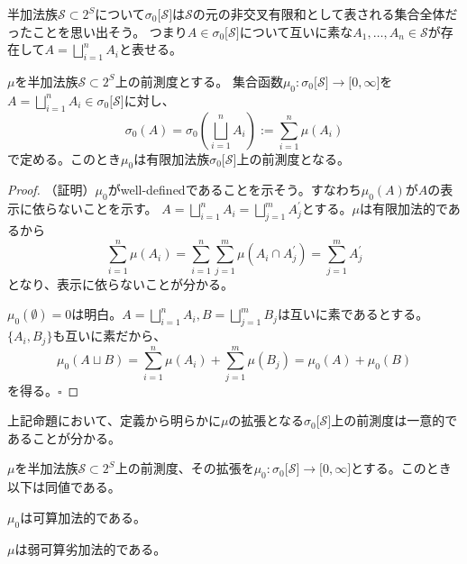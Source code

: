\documentclass[../root.tex]{subfiles}
\begin{document}
半加法族$ \mathscr{S}\subset 2^{S} $について$ \sigma_{0}\lbrack \mathscr{S} \rbrack $は$ \mathscr{S} $の元の非交叉有限和として表される集合全体だったことを思い出そう。
つまり$ A\in\sigma_{0}\lbrack \mathscr{S} \rbrack $について互いに素な$ A_{1}, \dotsc, A_{n}\in\mathscr{S} $が存在して$ A=\bigsqcup_{i=1}^{n}A_{i} $と表せる。

\begin{Prop}{}{}
$ \mu $を半加法族$ \mathscr{S}\subset 2^{S} $上の前測度とする。
集合函数$ \mu_{0}\colon\sigma_{0}\lbrack \mathscr{S} \rbrack\rightarrow\lbrack 0, \infty \rbrack $を
$ A=\bigsqcup_{i=1}^{n}A_{i}\in\sigma_{0}\lbrack \mathscr{S} \rbrack $に対し、
\[ \sigma_{0}( A )=\sigma_{0}\left( \bigsqcup_{i=1}^{n}A_{i} \right):=\sum_{i=1}^{n}\mu( A_{i} ) \]
で定める。このとき$ \mu_{0} $は有限加法族$ \sigma_{0}\lbrack \mathscr{S} \rbrack $上の前測度となる。
\end{Prop}

\begin{proof}
（証明）$ \mu_{0} $がwell-definedであることを示そう。すなわち$ \mu_{0}( A ) $が$ A $の表示に依らないことを示す。
$ A=\bigsqcup_{i=1}^{n}A_{i}=\bigsqcup_{j=1}^{m}A^{\prime}_{j} $とする。$ \mu $は有限加法的であるから
\[ \sum_{i=1}^{n}\mu( A_{i} )=\sum_{i=1}^{n}\sum_{j=1}^{m}\mu( A_{i}\cap A^{\prime}_{j} )=\sum_{j=1}^{m}A^{\prime}_{j} \]
となり、表示に依らないことが分かる。

$ \mu_{0}( \emptyset )=0 $は明白。$ A=\bigsqcup_{i=1}^{n}A_{i}, B=\bigsqcup_{j=1}^{m}B_{j} $は互いに素であるとする。$ \lbrace A_{i}, B_{j} \rbrace $も互いに素だから、
\[ \mu_{0}( A\sqcup B )=\sum_{i=1}^{n}\mu( A_{i} )+\sum_{j=1}^{m}\mu( B_{j} )=\mu_{0}( A )+\mu_{0}( B ) \]
を得る。$ \square $
\end{proof}

上記命題において、定義から明らかに$ \mu $の拡張となる$ \sigma_{0}\lbrack \mathscr{S} \rbrack $上の前測度は一意的であることが分かる。

\begin{Lem}{}{}
$ \mu $を半加法族$ \mathscr{S}\subset 2^{S} $上の前測度、その拡張を$ \mu_{0}\colon\sigma_{0}\lbrack \mathscr{S} \rbrack\rightarrow\lbrack 0, \infty \rbrack $とする。このとき以下は同値である。
\begin{EnumEquiv}
\item $ \mu_{0} $は可算加法的である。
\item $ \mu $は弱可算劣加法的である。
\end{EnumEquiv}
\end{Lem}
\end{document}
